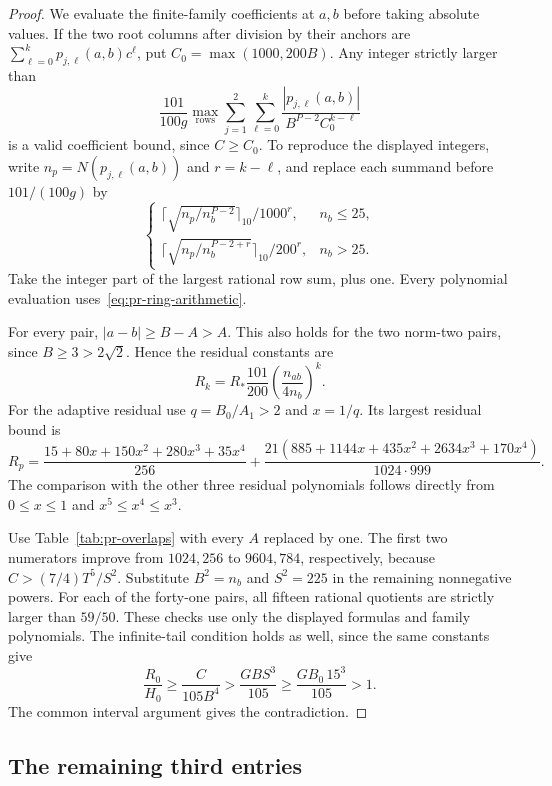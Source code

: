 \documentclass[12pt]{article}
\numberwithin{equation}{section}
\begin{document}
\begin{proof}
We evaluate the finite-family coefficients at $a,b$ before taking
absolute values. If the two root columns after division by their
anchors are $\sum_{\ell=0}^k p_{j,\ell}(a,b)c^\ell$, put
$C_0=\max(1000,200B)$. Any integer strictly larger than
\begin{equation*}
 \frac{101}{100g}\max_{\mathrm{rows}}
 \sum_{j=1}^2\sum_{\ell=0}^k
 \frac{|p_{j,\ell}(a,b)|}{B^{P-2}C_0^{k-\ell}}
\end{equation*}
is a valid coefficient bound, since $C\ge C_0$.
To reproduce the displayed integers, write
$n_p=N(p_{j,\ell}(a,b))$ and $r=k-\ell$, and replace each summand
before $101/(100g)$ by
\[
 \begin{cases}
 \lceil\sqrt{n_p/n_b^{P-2}}\rceil_{10}/1000^r,&n_b\le25,\\
 \lceil\sqrt{n_p/n_b^{P-2+r}}\rceil_{10}/200^r,&n_b>25.
 \end{cases}
\]
Take the integer part of the largest rational row sum, plus one.
Every polynomial evaluation uses~\eqref{eq:pr-ring-arithmetic}.

For every pair, $|a-b|\ge B-A>A$. This also holds for the two
norm-two pairs, since $B\ge3>2\sqrt2$. Hence the residual constants are
\begin{equation*}
 R_k=R_*\frac{101}{200}
                 \left(\frac{n_{ab}}{4n_b}\right)^k.
\end{equation*}
For the adaptive residual use $q=B_0/A_1>2$ and $x=1/q$.
Its largest residual bound is
\begin{equation*}
 R_p=\frac{15+80x+150x^2+280x^3+35x^4}{256}
 +\frac{21(885+1144x+435x^2+2634x^3+170x^4)}{1024\cdot999}.
\end{equation*}
The comparison with the other three residual polynomials follows
directly from $0\le x\le1$ and $x^5\le x^4\le x^3$.

Use Table~\ref{tab:pr-overlaps} with every $A$ replaced by one.
The first two numerators improve from $1024,256$ to $9604,784$,
respectively, because $C>(7/4)T^5/S^2$.
Substitute $B^2=n_b$ and $S^2=225$ in the remaining nonnegative
powers. For each of the forty-one pairs, all fifteen rational
quotients are strictly larger than $59/50$.
These checks use only the displayed formulas and family polynomials.
The infinite-tail condition holds as well, since the same constants give
\[
 \frac{R_0}{H_0}\ge\frac{C}{105B^4}
 >\frac{GBS^3}{105}\ge\frac{GB_0\,15^3}{105}>1.
\]
The common interval argument gives the contradiction.
\end{proof}

\subsection{The remaining third entries}
\end{document}
